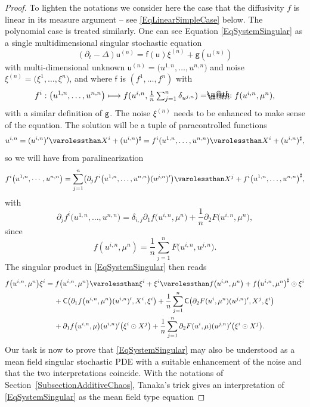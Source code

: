 \documentclass[JEP,XML,SOM,Unicode,published]{cedram}
\makeatletter
\newcommand\mto{\mathchoice{\longmapsto}{\mapsto}{\mapsto}{\mapsto}}
\theoremstyle{definition}
\newcommand*{\eqdef}{=\mathrel{\rlap{%
\raisebox{0.3ex}{$\m@th\cdot$}}%
\raisebox{-0.3ex}{$\m@th\cdot$}}%
}
\makeatother
\begin{document}
\begin{proof}
To lighten the notations we consider here the case that the diffusivity $f$ is linear in its measure argument -- see \eqref{EqLinearSimpleCase} below. The polynomial case is treated similarly. One can see Equation \eqref{EqSystemSingular} as a single multidimensional singular stochastic equation
\[
(\partial_t-\Delta)\mathsf{u}^{(n)} = \mathsf{f}(\mathsf{u})\xi^{(n)} + \mathsf{g}(\mathsf{u}^{(n)})
\]
with multi-dimensional unknown $\mathsf{u}^{(n)} = \bigl(u^{1,n},\dots,u^{n,n}\bigr)$ and noise $\xi^{(n)} = \bigl(\xi^1,\dots,\xi^n\bigr)$, and where $\mathsf{f}$ is $(f^1,\dots,f^n)$ with
\[
f^i : \bigl(u^{1,n},\dots,u^{n,n}\bigr)\mto \textstyle f(u^{i,n},\frac{1}{n}\sum_{j=1}^n\delta_{u^{j,n}}) \eqdef f(u^{i,n},\mu^n),
\]
with a similar definition of $\sf g$. The noise $\xi^{(n)}$ needs to be enhanced to make sense of the equation. The solution will be a tuple of paracontrolled functions
\[
u^{i,n} = (u^{i,n})' \varolessthan X^i + (u^{i,n})^\sharp = f^i(u^{1,n},\dots,u^{n,n}) \varolessthan X^i + (u^{i,n})^\sharp,
\]
so we will have from paralinearization
\[
f^i\bigl(u^{1,n},\cdots,u^{n,n} \bigr) = \sum_{j=1}^n \bigl(\partial_j f^i\bigl(u^{1,n},\dots,u^{n,n}\bigr)(u^{j,n})'\bigr) \varolessthan X^j + f^i\bigl(u^{1,n},\dots,u^{n,n}\bigr)^\sharp,
\]
with
\[
\partial_j f^i\bigl(u^{1,n},\dots,u^{n,n}\bigr)=\delta_{i,j}\partial_1 f\bigl(u^{i,n},\mu^n\bigr) + \frac{1}{n} \partial_2 F\bigl(u^{i,n},\mu^n\bigr),
\]
since
\begin{equation} \label{EqLinearSimpleCase}
f(u^{i,n}, \mu^n) = \frac{1}{n}\sum_{j=1}^n F\bigl(u^{i,n},u^{j,n}\bigr).
\end{equation}
The singular product in \eqref{EqSystemSingular} then reads
\begin{align} \label{EqFormulation1}
f\bigl(u^{i,n},\mu^n\bigr) &\xi^i = f\bigl(u^{i,n},\mu^n\bigr) \varolessthan \xi^i + \xi^i\varolessthan f\bigl(u^{i,n},\mu^n\bigr)+ f\bigl(u^{i,n},\mu^n\bigr)^\sharp\odot\xi^i\notag
\\
&\qquad+\mathsf{C}\bigl( \partial_1 f\bigl(u^{i,n},\mu^n\bigr)(u^{i,n})', X^i, \xi^i\bigr) + \frac{1}{n}\sum_{j=1}^n \mathsf{C}\bigl(\partial_2 F(u^i,\mu^n)(u^{j,n})', X^j, \xi^i \bigr)
\\
&\qquad + \partial_1 f\bigl(u^{i,n},\mu\bigr)(u^{i,n})' \bigl(\xi^i\odot X^j\bigr) + \frac{1}{n}\sum_{j=1}^n \partial_2 F(u^i,\mu)(u^{j,n})' \bigl(\xi^i \odot X^j\bigr).\notag
\end{align}
Our task is now to prove that \eqref{EqSystemSingular} may also be understood as a mean field singular stochastic PDE with a suitable enhancement of the noise and that the two interpretations coincide. With the notations of Section~\ref{SubsectionAdditiveChaos}, Tanaka's trick gives an interpretation of \eqref{EqSystemSingular} as the mean field type equation

\end{proof}
\end{document}
